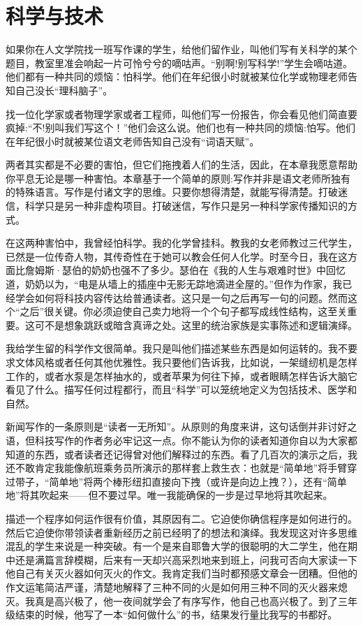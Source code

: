 \chapter{科学与技术}
如果你在人文学院找一班写作课的学生，给他们留作业，叫他们写有关科学的某个题目，教室里准会响起一片可怜兮兮的嘀咕声。“别啊!别写科学!”学生会嘀咕道。他们都有一种共同的烦恼：怕科学。他们在年纪很小时就被某位化学或物理老师告知自己没长“理科脑子”。

找一位化学家或者物理学家或者工程师，叫他们写一份报告，你会看见他们简直要疯掉:“不!别叫我们写这个！”他们会这么说。他们也有一种共同的烦恼:怕写。他们在年纪很小时就被某位语文老师告知自己没有“词语天赋”。

两者其实都是不必要的害怕，但它们拖拽着人们的生活，因此，在本章我愿意帮助你平息无论是哪一种害怕。本章基于一个简单的原则:写作并非是语文老师所独有的特殊语言。写作是付诸文字的思维。只要你想得清楚，就能写得清楚。打破迷信，科学只是另一种非虚构项目。打破迷信，写作只是另一种科学家传播知识的方式。

在这两种害怕中，我曾经怕科学。我的化学曾挂科。教我的女老师教过三代学生，已然是一位传奇人物，其传奇性在于她可以教会任何人化学。时至今日，我在这方面比詹姆斯·瑟伯的奶奶也强不了多少。瑟伯在《我的人生与艰难时世》中回忆道，奶奶以为，“电是从墙上的插座中无影无踪地滴进全屋的。”但作为作家，我已经学会如何将科技内容传达给普通读者。这只是一句之后再写一句的问题。然而这个“之后”很关键。你必须迫使自己卖力地将一个个句子都写成线性结构，这至关重要。这可不是想象跳跃或暗含真谛之处。这里的统治家族是实事陈述和逻辑演绎。

我给学生留的科学作文很简单。我只是叫他们描述某些东西是如何运转的。我不要求文体风格或者任何其他优雅性。我只要他们告诉我，比如说，一架缝纫机是怎样工作的，或者水泵是怎样抽水的，或者苹果为何往下掉，或者眼睛怎样告诉大脑它看见了什么。描写任何过程都行，而且“科学”可以笼统地定义为包括技术、医学和自然。

新闻写作的一条原则是“读者一无所知”。从原则的角度来讲，这句话倒并非讨好之语，但科技写作的作者务必牢记这一点。你不能认为你的读者知道你自以为大家都知道的东西，或者读者还记得曾对他们解释过的东西。看了几百次的演示之后，我还不敢肯定我能像航班乘务员所演示的那样套上救生衣：也就是“简单地”将手臂穿过带子，“简单地”将两个棒形纽扣直接向下拽（或许是向边上拽？），还有“简单地”将其吹起来——但不要过早。唯一我能确保的一步是过早地将其吹起来。

描述一个程序如何运作很有价值，其原因有二。它迫使你确信程序是如何进行的。然后它迫使你带领读者重新经历之前已经明了的想法和演绎。我发现这对许多思维混乱的学生来说是一种突破。有一个是来自耶鲁大学的很聪明的大二学生，他在期中还是满篇言辞模糊，后来有一天却兴高采烈地来到班上，问我可否向大家读一下他自己有关灭火器如何灭火的作文。我肯定我们当时都预感文章会一团糟。但他的作文运笔简洁严谨，清楚地解释了三种不同的火是如何用三种不同的灭火器来熄灭。我真是高兴极了，他一夜间就学会了有序写作，他自己也高兴极了。到了三年级结束的时候，他写了一本“如何做什么”的书，结果发行量比我写的书都好。

